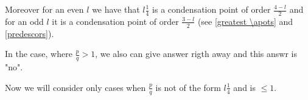 Moreover for an even $l$ we have that $l\frac{1}{4}$ is a condensation point of order 
$\frac{4-l}{2}$ 
and for an odd $l$ it is a condensation point of order $\frac{3-l}{2}$ (see \ref{greatest \apots} 
and \ref{predescors}). 

In the case, where $\frac{p}{q} > 1$, we also can give answer rigth away and this answr is "no". 

Now we will consider only cases when $\frac{p}{q}$ is not of the form $l\frac{1}{4}$ and is 
$\leq 1$.
%
%
%
%
%
%
